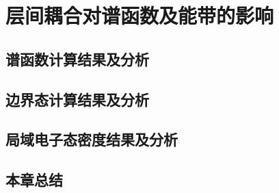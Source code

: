 \section{层间耦合对谱函数及能带的影响}
\subsection{谱函数计算结果及分析}
\subsection{边界态计算结果及分析}
\subsection{局域电子态密度结果及分析}
\subsection{本章总结}
